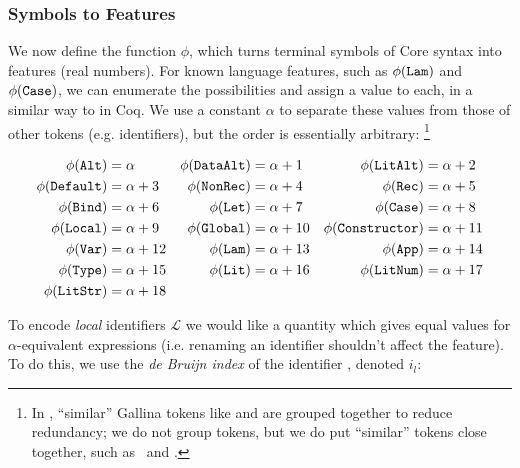 \subsubsection{Symbols to Features}
\label{sec:symbolstofeatures}

We now define the function $\phi$, which turns terminal symbols of Core syntax into features (real numbers). For known language features, such as $\phi(\texttt{Lam})$ and $\phi(\texttt{Case})$, we can enumerate the possibilities and assign a value to each, in a similar way to \cite{DBLP:journals/corr/HerasK14} in Coq. We use a constant $\alpha$ to separate these values from those of other tokens (e.g. identifiers), but the order is essentially arbitrary: \footnote{In \cite{DBLP:journals/corr/HerasK14}, ``similar'' Gallina tokens like  and  are grouped together to reduce redundancy; we do not group tokens, but we do put ``similar'' tokens close together, such as \CLocal\ and \CGlobal.}

\begin{equation} \label{eq:feature}
  \begin{aligned}
    \phi(\texttt{Alt})          &= \alpha      &
    \phi(\texttt{DataAlt})      &= \alpha + 1  &
    \phi(\texttt{LitAlt})       &= \alpha + 2  \\
    \phi(\texttt{Default})      &= \alpha + 3  &
    \phi(\texttt{NonRec})       &= \alpha + 4  &
    \phi(\texttt{Rec})          &= \alpha + 5  \\
    \phi(\texttt{Bind})         &= \alpha + 6  &
    \phi(\texttt{Let})          &= \alpha + 7  &
    \phi(\texttt{Case})         &= \alpha + 8  \\
    \phi(\texttt{Local})        &= \alpha + 9  &
    \phi(\texttt{Global})       &= \alpha + 10 &
    \phi(\texttt{Constructor})  &= \alpha + 11 \\
    \phi(\texttt{Var})          &= \alpha + 12 &
    \phi(\texttt{Lam})          &= \alpha + 13 &
    \phi(\texttt{App})          &= \alpha + 14 \\
    \phi(\texttt{Type})         &= \alpha + 15 &
    \phi(\texttt{Lit})          &= \alpha + 16 &
    \phi(\texttt{LitNum})       &= \alpha + 17 \\
    \phi(\texttt{LitStr})       &= \alpha + 18
  \end{aligned}
\end{equation}

To encode \emph{local} identifiers $\mathcal{L}$ we would like a quantity which gives equal values for $\alpha$-equivalent expressions (i.e. renaming an identifier shouldn't affect the feature). To do this, we use the \emph{de Bruijn index} of the identifier \cite{de1972lambda}, denoted $i_l$:

